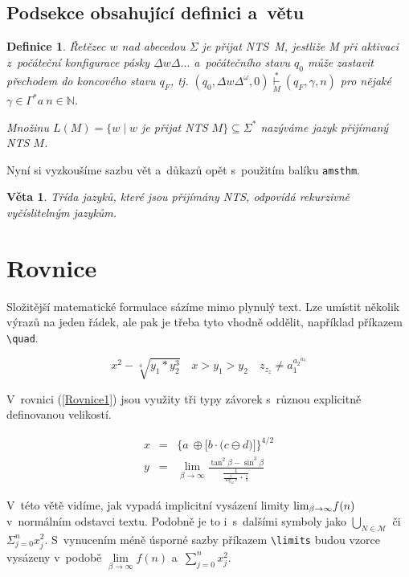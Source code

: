 \documentclass[twocolumn, a4paper, 11pt]{article}
\newtheorem{Def}{Definice}
\newtheorem{Veta}{Věta}
\begin{document}
    \subsection{Podsekce obsahující definici a~větu}
        \begin{Def}
        \label{Def2}
            \textup{Řetězec $w$ nad abecedou ${\Sigma}$ je přijat NTS~M}, jestliže M při aktivaci z~počáteční konfigurace pásky ${\underline{\Delta} w \Delta \dots}$ a~počátečního stavu ${q_0}$ může zastavit přechodem do koncového stavu ${q_F}$, tj. $(q_0,\Delta w \Delta^\omega,0) \overset{*} {\underset{M}{\vdash}} (q_F,\gamma,n) $ pro nějaké ${\gamma \in \Gamma^* a~n \in \mathbb{N}}$.
            
            Množinu $L(M) = \{w\;|\;w $ je přijat NTS $M \} \subseteq \Sigma^*$ \textup{nazýváme jazyk přijímaný NTS} $M$. 
        \end{Def}
        Nyní si vyzkoušíme sazbu vět a~důkazů opět s~použitím balíku \texttt{amsthm}.
        \begin{Veta}
            Třída jazyků, které jsou přijímány NTS, odpovídá \textup{rekurzivně vyčíslitelným jazykům}.
        \end{Veta}
        
        
\section{Rovnice}
    Složitější matematické formulace sázíme mimo plynulý text. Lze umístit několik výrazů na jeden řádek, ale pak je třeba tyto vhodně oddělit, například příkazem \verb|\quad|.
    
    $${x^2 - \sqrt[4]{y_1 * y_2^3} \quad x > y_1 > y_2 \quad z_{z_z} \neq a_1^{{a_2}^{a_3}}}$$
    
    V~rovnici (\ref{Rovnice1}) jsou využity tři typy závorek s~různou explicitně definovanou velikostí.
        
        \begin{eqnarray}
            x & = & \Bigg\{ a~\oplus \bigg[ b \cdot \big(c \ominus d \big) \bigg] \Bigg\}^{4/2} 
        \label{Rovnice1}
            \\
            y & = & \lim\limits_{\beta\rightarrow\infty} \frac{\tan^2 \beta - \sin^3     \beta}{\frac{1}{\frac{1}{\log_{42}x}+\frac{1}{2}}}
        \label{Rovnice2}
        \end{eqnarray}
        

    V~této větě vidíme, jak vypadá implicitní vysázení limity $ \textup{lim}_{\beta\rightarrow\infty} f(n)$ v~normálním odstavci textu. Podobně je to i~s~dalšími symboly jako $\bigcup_{N \in \mathcal{M}}$ či $\Sigma^n_{j = 0} x^2_j$. 
    S~vynucením méně úsporné sazby příkazem \verb|\limits| budou vzorce vysázeny v~podobě 
    $\lim\limits_{\beta\rightarrow\infty} f(n)$ a~$\sum\limits_{j=0}^n x_j^2$.
    
\end{document}
